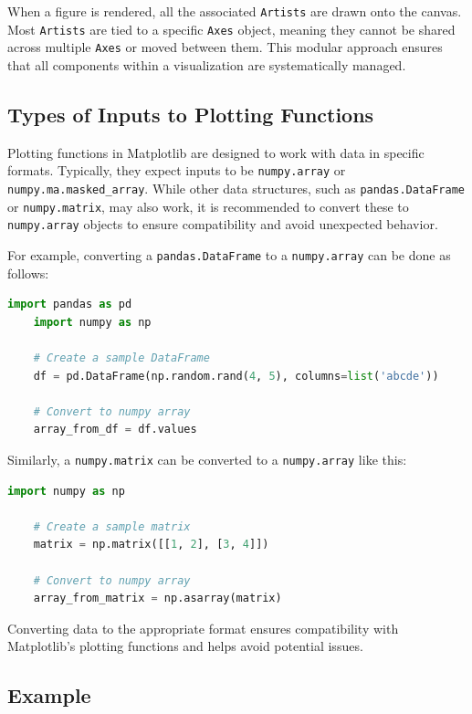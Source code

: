 When a figure is rendered, all the associated \texttt{Artists} are drawn onto the canvas. Most \texttt{Artists} are tied to a specific \texttt{Axes} object, meaning they cannot be shared across multiple \texttt{Axes} or moved between them. This modular approach ensures that all components within a visualization are systematically managed.

\subsection{Types of Inputs to Plotting Functions}

Plotting functions in Matplotlib are designed to work with data in specific formats. Typically, they expect inputs to be \texttt{numpy.array} or \texttt{numpy.ma.masked\_array}. While other data structures, such as \texttt{pandas.DataFrame} or \texttt{numpy.matrix}, may also work, it is recommended to convert these to \texttt{numpy.array} objects to ensure compatibility and avoid unexpected behavior.

For example, converting a \texttt{pandas.DataFrame} to a \texttt{numpy.array} can be done as follows:

\begin{lstlisting}[language=Python]
	import pandas as pd
	import numpy as np
	
	# Create a sample DataFrame
	df = pd.DataFrame(np.random.rand(4, 5), columns=list('abcde'))
	
	# Convert to numpy array
	array_from_df = df.values
\end{lstlisting}

Similarly, a \texttt{numpy.matrix} can be converted to a \texttt{numpy.array} like this:

\begin{lstlisting}[language=Python]
	import numpy as np
	
	# Create a sample matrix
	matrix = np.matrix([[1, 2], [3, 4]])
	
	# Convert to numpy array
	array_from_matrix = np.asarray(matrix)
\end{lstlisting}

Converting data to the appropriate format ensures compatibility with Matplotlib’s plotting functions and helps avoid potential issues.

\subsection{Example}

